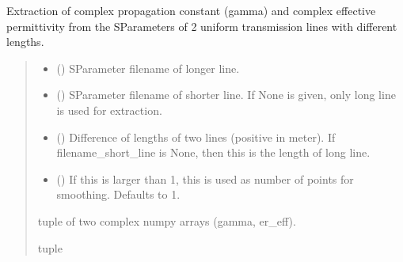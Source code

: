 \documentclass[letterpaper,10pt,english]{sphinxmanual}
\begin{document}
\begin{fulllineitems}
\label{\detokenize{touchstone:touchstone.extract_gamma_ereff}}
\pysigstartsignatures
{}
\pysigstopsignatures
\sphinxAtStartPar
Extraction of complex propagation constant (gamma) and complex effective permittivity from the S\sphinxhyphen{}Parameters of 2 uniform transmission lines with different lengths.
\begin{quote}\begin{description}
\begin{itemize}
\item {} 
\sphinxAtStartPar
{} () \textendash{} S\sphinxhyphen{}Parameter filename of longer line.

\item {} 
\sphinxAtStartPar
{} () \textendash{} S\sphinxhyphen{}Parameter filename of shorter line. If None is given, only long line is used for extraction.

\item {} 
\sphinxAtStartPar
{} () \textendash{} Difference of lengths of two lines (positive in meter). If filename\_short\_line is None, then this is the length of long line.

\item {} 
\sphinxAtStartPar
{} (\sphinxstyleliteralemphasis{\sphinxupquote{, }}) \textendash{} If this is larger than 1, this is used as number of points for smoothing. Defaults to 1.

\end{itemize}

\sphinxAtStartPar
tuple of two complex numpy arrays (gamma, er\_eff).

\sphinxAtStartPar
tuple

\end{description}\end{quote}

\end{fulllineitems}
\end{document}
